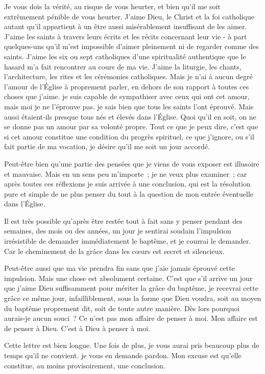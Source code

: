 \documentclass[french,twoside]{book} %
\begin{document}
Je vous dois la vérité, au risque de vous heurter, et bien qu'il me soit extrêmement pénible de vous heurter. J'aime Dieu, le Christ et la foi catholique autant qu'il appartient à un être aussi misérablement insuffisant de les aimer. J'aime les saints à travers leurs écrits et les récits concernant leur vie - à part quelques-uns qu'il m'est impossible d'aimer pleinement ni de regarder comme des saints. J'aime les six ou sept catholiques d'une spiritualité authentique que le hasard m'a fait rencontrer au cours de ma vie. J'aime la liturgie, les chants, l'architecture, les rites et les cérémonies catholiques. Mais je n'ai à aucun degré l'amour de l'Église à proprement parler, en dehors de son rapport à toutes ces choses que j'aime. je suis capable de sympathiser avec ceux qui ont cet amour, mais moi je ne l'éprouve pas. je sais bien que tous les saints l'ont éprouvé. Mais aussi étaient-ils presque tous nés et élevés dans l'Église. Quoi qu'il en soit, on ne se donne pas un amour par sa volonté propre. Tout ce que je peux dire, c'est que si cet amour constitue une condition du progrès spirituel, ce que j'ignore, ou s'il fait partie de ma vocation, je désire qu'il me soit un jour accordé.\par
Peut-être bien qu'une partie des pensées que je viens de vous exposer est illusoire et mauvaise. Mais en un sens peu m'importe ; je ne veux plus examiner ; car après toutes ces réflexions je suis arrivée à une conclusion, qui est la résolution pure et simple de ne plus penser du tout à la question de mon entrée éventuelle dans l'Église.\par
Il est très possible qu'après être restée tout à fait sans y penser pendant des semaines, des mois ou des années, un jour je sentirai soudain l'impulsion irrésistible de demander immédiatement le baptême, et je courrai le demander. Car le cheminement de la grâce dans les cœurs est secret et silencieux.\par
Peut-être aussi que ma vie prendra fin sans que j'aie jamais éprouvé cette impulsion. Mais une chose est absolument certaine. C'est que s'il arrive un jour que j'aime Dieu suffisamment pour mériter la grâce du baptême, je recevrai cette grâce ce même jour, infailliblement, sous la forme que Dieu voudra, soit au moyen du baptême proprement dit, soit de toute autre manière. Dès lors pourquoi aurais-je aucun souci ? Ce n'est pas mon affaire de penser à moi. Mon affaire est de penser à Dieu. C'est à Dieu à penser à moi.\par
Cette lettre est bien longue. Une fois de plus, je vous aurai pris beaucoup plus de temps qu'il ne convient. je vous en demande pardon. Mon excuse est qu'elle constitue, au moins provisoirement, une conclusion.\par
\end{document}
